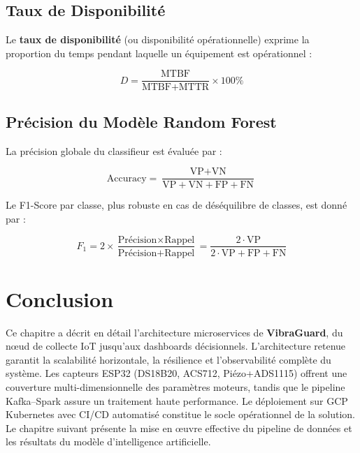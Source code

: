 \documentclass[12pt, a4paper, oneside]{report}
\newcommand{\projectname}{\textbf{VibraGuard}}
\begin{document}
\subsection{Taux de Disponibilité}

Le \textbf{taux de disponibilité} (ou disponibilité opérationnelle) exprime la proportion
du temps pendant laquelle un équipement est opérationnel :

\begin{equation}
  D = \frac{\text{MTBF}}{\text{MTBF} + \text{MTTR}} \times 100\%
\end{equation}

\subsection{Précision du Modèle Random Forest}

La précision globale du classifieur est évaluée par :

\begin{equation}
  \text{Accuracy} = \frac{\text{VP} + \text{VN}}{\text{VP} + \text{VN} + \text{FP} + \text{FN}}
\end{equation}

Le F1-Score par classe, plus robuste en cas de déséquilibre de classes, est donné par :

\begin{equation}
  F_1 = 2 \times \frac{\text{Précision} \times \text{Rappel}}{\text{Précision} + \text{Rappel}}
  = \frac{2 \cdot \text{VP}}{2 \cdot \text{VP} + \text{FP} + \text{FN}}
\end{equation}

\section{Conclusion}

Ce chapitre a décrit en détail l'architecture microservices de \projectname{}, du nœud
de collecte IoT jusqu'aux dashboards décisionnels. L'architecture retenue garantit la
scalabilité horizontale, la résilience et l'observabilité complète du système. Les capteurs
ESP32 (DS18B20, ACS712, Piézo+ADS1115) offrent une couverture multi-dimensionnelle des
paramètres moteurs, tandis que le pipeline Kafka--Spark assure un traitement haute performance.
Le déploiement sur GCP Kubernetes avec CI/CD automatisé constitue le socle opérationnel de
la solution. Le chapitre suivant présente la mise en œuvre effective du pipeline de données
et les résultats du modèle d'intelligence artificielle.
\end{document}

